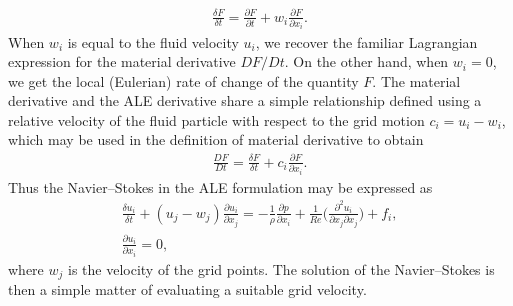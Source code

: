 \begin{align}
\frac{\delta F}{\delta t} = \frac{\partial F}{\partial t} + w_{i}\frac{\partial F}{\partial x_{i}}.
\label{eqn:ale_derivative}
\end{align}
When $w_{i}$ is equal to the fluid velocity $u_{i}$, we recover the familiar Lagrangian expression for the material derivative $DF/Dt$. On the other hand, when $w_{i}=0$, we get the local (Eulerian) rate of change of the quantity $F$. The material derivative and the ALE derivative share a simple relationship defined using a relative velocity of the fluid particle with respect to the grid motion $c_{i} = u_{i} - w_{i}$, which may be used in the definition of material derivative to obtain
	\begin{align}
	\frac{DF}{Dt} = \frac{\delta F}{\delta t} + c_{i}\frac{\partial F}{\partial x_{i}}.
	\label{eqn:ale_material_derivative}
	\end{align}
Thus the Navier--Stokes in the ALE formulation may be expressed as 
\begin{subequations}
	\label{eqn:ale_navier_stokes}	
	\begin{align}
	\frac{\delta u_{i}}{\delta t} + (u_{j} - w_{j})\frac{\partial u_{i}}{\partial x_{j}} =  - \frac{1}{\rho}\frac{\partial p}{\partial x_{i}} + \frac{1}{Re}\bigg(\frac{\partial^{2} u_{i}}{\partial x_{j}\partial x_{j}}  \bigg) +f_{i}, \\
	\frac{\partial u_{i}}{\partial x_{i}} = 0,
	\end{align}
\end{subequations}
where $w_{j}$ is the velocity of the grid points. The solution of the Navier--Stokes is then a simple matter of evaluating a suitable grid velocity. 


